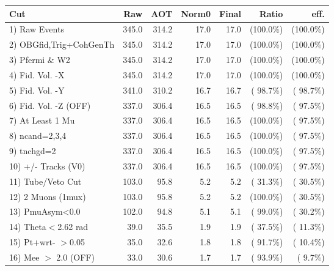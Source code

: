  \begin{table}[h!]\centering
 \begin{tabular}{||l||r|r|r|r|r|r||}
 \hline
 \hline
 Cut & Raw & AOT & Norm0 & Final & Ratio & eff.       \\
 \hline
  1) Raw Events           &        345.0 &        314.2 &         17.0 &         17.0 & (100.0\%) & (100.0\%) \\
  2) OBGfid,Trig+CohGenTh &        345.0 &        314.2 &         17.0 &         17.0 & (100.0\%) & (100.0\%) \\
  3) Pfermi \& W2         &        345.0 &        314.2 &         17.0 &         17.0 & (100.0\%) & (100.0\%) \\
  4) Fid. Vol. -X         &        345.0 &        314.2 &         17.0 &         17.0 & (100.0\%) & (100.0\%) \\
  5) Fid. Vol. -Y         &        341.0 &        310.2 &         16.7 &         16.7 & ( 98.7\%) & ( 98.7\%) \\
  6) Fid. Vol. -Z (OFF)   &        337.0 &        306.4 &         16.5 &         16.5 & ( 98.8\%) & ( 97.5\%) \\
  7) At Least 1 Mu        &        337.0 &        306.4 &         16.5 &         16.5 & (100.0\%) & ( 97.5\%) \\
  8) ncand=2,3,4          &        337.0 &        306.4 &         16.5 &         16.5 & (100.0\%) & ( 97.5\%) \\
  9) tnchgd=2             &        337.0 &        306.4 &         16.5 &         16.5 & (100.0\%) & ( 97.5\%) \\
 10) +/- Tracks (V0)      &        337.0 &        306.4 &         16.5 &         16.5 & (100.0\%) & ( 97.5\%) \\
 11) Tube/Veto Cut        &        103.0 &         95.8 &          5.2 &          5.2 & ( 31.3\%) & ( 30.5\%) \\
 12) 2 Muons (1mux)       &        103.0 &         95.8 &          5.2 &          5.2 & (100.0\%) & ( 30.5\%) \\
 13) PmuAsym<0.0          &        102.0 &         94.8 &          5.1 &          5.1 & ( 99.0\%) & ( 30.2\%) \\
 14) Theta$<$2.62 rad     &         39.0 &         35.5 &          1.9 &          1.9 & ( 37.5\%) & ( 11.3\%) \\
 15) Pt+wrt- $>$0.05      &         35.0 &         32.6 &          1.8 &          1.8 & ( 91.7\%) & ( 10.4\%) \\
 16) Mee $>$ 2.0  (OFF)   &         33.0 &         30.6 &          1.7 &          1.7 & ( 93.9\%) & (  9.7\%) \\

\end{tabular}
\end{table}
